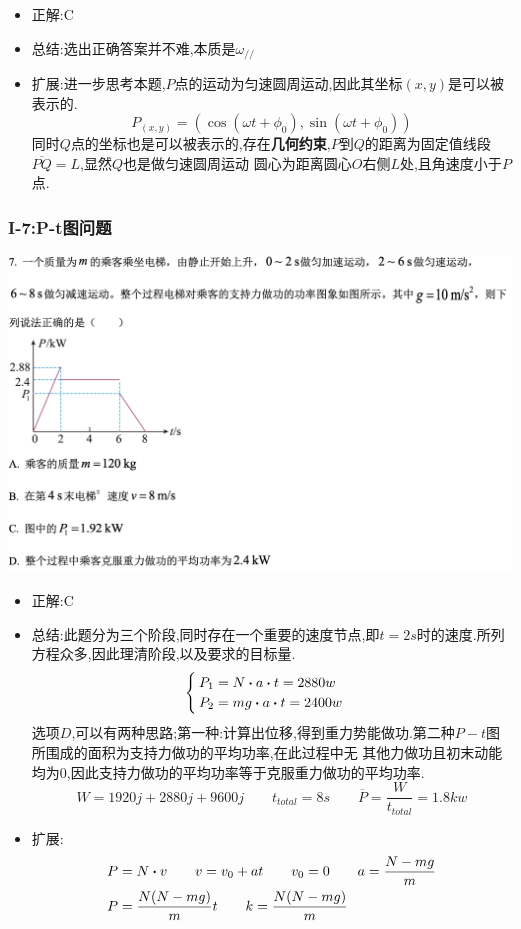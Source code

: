 \documentclass{article}
\begin{document}
\begin{itemize}
    \item 正解:\quad C
    \item 总结:\quad 选出正确答案并不难,本质是$\omega_{//}$
    \item 扩展:\quad 进一步思考本题,$P$点的运动为匀速圆周运动,因此其坐标$(x,y)$是可以被表示的.
          $$
              P_(x,y) = (\cos{(\omega t + \phi_{0})} , \sin{(\omega t + \phi_{0})})
          $$
          同时$Q$点的坐标也是可以被表示的,存在\textbf{几何约束},$P$到$Q$的距离为固定值线段$\overline{PQ} = L$,显然$Q$也是做匀速圆周运动
          圆心为距离圆心$O$右侧$L$处,且角速度小于$P$点.
\end{itemize}

\vspace{2em}

\subsubsection{I-7:P-t图问题}
\includegraphics[width=50em,keepaspectratio]{./pictures/1.2-2.png}

\begin{itemize}
    \item 正解:\quad C
    \item 总结:\quad 此题分为三个阶段,同时存在一个重要的速度节点,即$t = 2s$时的速度.所列方程众多,因此理清阶段,以及要求的目标量.
          $$
              \begin{cases}
                  P_{1} = N \vdot a \vdot t = 2880 w \\
                  P_{2} = mg \vdot a \vdot t  = 2400 w
              \end{cases}
          $$
          选项$D$,可以有两种思路;第一种:计算出位移,得到重力势能做功.第二种$P-t$图所围成的面积为支持力做功的平均功率,在此过程中无
          其他力做功且初末动能均为0,因此支持力做功的平均功率等于克服重力做功的平均功率.
          $$ W = 1920j + 2880j + 9600 j \qquad t_{total} = 8s \qquad \overline{P} = \frac{W}{t_{total}} = 1.8kw $$

    \item 扩展:
          \begin{align}
              P & = N \vdot v \qquad v = v_{0} + a t \qquad v_{0} = 0 \qquad a = \frac{N-mg}{m} \\
              P & = \frac{N(N-mg)}{m} t \qquad  k = \frac{N(N-mg)}{m}
          \end{align}
\end{itemize}
\end{document}

